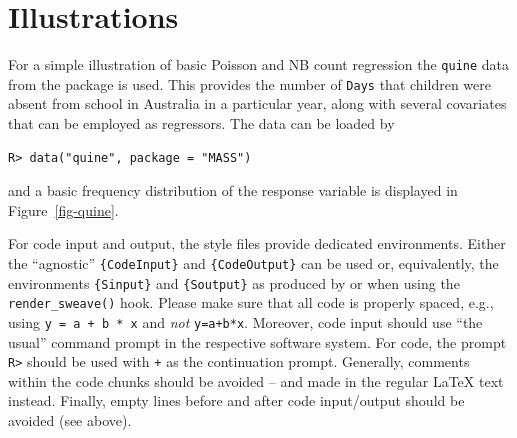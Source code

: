 \documentclass[
  article]{jss}
\newcommand{\fct}[1]{\code{#1()}}
\begin{document}
\hypertarget{sec-illustrations}{%
\section{Illustrations}\label{sec-illustrations}}

For a simple illustration of basic Poisson and NB count regression the
\texttt{quine} data from the  package is used. This provides
the number of \texttt{Days} that children were absent from school in
Australia in a particular year, along with several covariates that can
be employed as regressors. The data can be loaded by

\begin{verbatim}
R> data("quine", package = "MASS")
\end{verbatim}

and a basic frequency distribution of the response variable is displayed
in Figure~\ref{fig-quine}.

\begin{tcolorbox}[enhanced jigsaw, bottomrule=.15mm, colback=white, left=2mm, breakable, toprule=.15mm, opacityback=0, arc=.35mm, colframe=quarto-callout-color-frame, rightrule=.15mm, leftrule=.75mm]

For code input and output, the style files provide dedicated
environments. Either the ``agnostic'' \texttt{\{CodeInput\}} and
\texttt{\{CodeOutput\}} can be used or, equivalently, the environments
\texttt{\{Sinput\}} and \texttt{\{Soutput\}} as produced by \fct{Sweave}
or  when using the \texttt{render\_sweave()} hook. Please
make sure that all code is properly spaced, e.g., using
\texttt{y\ =\ a\ +\ b\ *\ x} and \emph{not} \texttt{y=a+b*x}. Moreover,
code input should use ``the usual'' command prompt in the respective
software system. For  code, the prompt
\texttt{R\textgreater{}} should be used with \texttt{+} as the
continuation prompt. Generally, comments within the code chunks should
be avoided -- and made in the regular {\LaTeX} text instead. Finally,
empty lines before and after code input/output should be avoided (see
above).

\end{tcolorbox}
\end{document}
